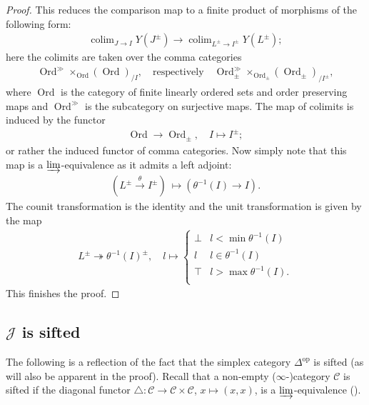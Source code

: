 \documentclass[12pt, reqno]{amsart}
\theoremstyle{plain}
\theoremstyle{definition}
\begin{document}
\begin{proof}
This reduces the comparison map to a finite product of morphisms of the following form:
\begin{align*}
\mathop{\operatorname{colim}}_{J\rightarrow I} Y(J^\pm)\rightarrow \mathop{\operatorname{colim}}_{L^\pm\rightarrow I^\pm} Y(L^\pm);
\end{align*}
here the colimits are taken over the comma categories
\begin{align*}
\operatorname{Ord}^\gg\mathop{\times}_{\operatorname{Ord}}(\operatorname{Ord})_{/I},\quad \text{respectively} \quad\operatorname{Ord}_\pm^\gg\mathop{\times}_{\operatorname{Ord}_\pm}(\operatorname{Ord}_\pm)_{/I^\pm},
\end{align*}
where $\operatorname{Ord}$ is the category of finite linearly ordered sets and order preserving maps and $\operatorname{Ord}^\gg$ is the subcategory on surjective maps. The map of colimits is induced by the functor
\begin{align*}
\operatorname{Ord}\rightarrow \operatorname{Ord}_\pm,\quad I\mapsto I^\pm;
\end{align*}
or rather the induced functor of comma categories. Now simply note that this map is a $\varinjlim$-equivalence as it admits a left adjoint:
\begin{align*}
(L^\pm\xrightarrow{\theta} I^\pm)\  \mapsto (\theta^{-1}(I) \rightarrow I).
\end{align*}
The counit transformation is the identity and the unit transformation is given by the map
\begin{align*}
L^\pm \twoheadrightarrow \theta^{-1}(I)^\pm,\quad l\mapsto \begin{cases}
\bot & l< \min \theta^{-1}(I) \\
l & l\in \theta^{-1}(I) \\
\top & l> \max \theta^{-1}(I). \\
\end{cases}
\end{align*}
This finishes the proof.
\end{proof}


\subsection{\texorpdfstring{$\mathcal{J}$}{J} is sifted}

The following is a reflection of the fact that the simplex category $\Delta^{\operatorname{op}}$ is sifted (as will also be apparent in the proof). Recall that a non-empty ($\infty$-)category $\mathcal{C}$ is sifted if the diagonal functor $\bigtriangleup \colon \mathcal{C}\rightarrow \mathcal{C}\times \mathcal{C}$, $x\mapsto (x,x)$, is a $\varinjlim$-equivalence (\cite[Definition 5.5.8.1]{LurieHTT}).
\end{document}
